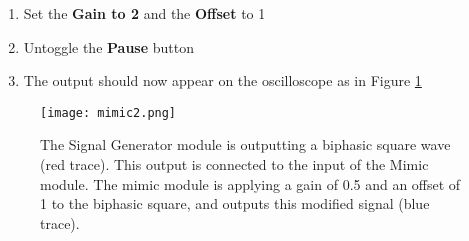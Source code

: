 \begin{enumerate}
\begin{itemize}
  \item Activate the channel by hitting the toggle button \textbf{Active}
  \item Change the scale to \textbf{1 V/div} in the Scale pulldown menu
  \item Change the color to \textbf{Blue}
  \item Click the \textbf{Apply} button to save the changes
  \end{itemize}
\item Set the \textbf{Gain to 2} and the \textbf{Offset} to 1
\item Untoggle the \textbf{Pause} button
\item The output should now appear on the oscilloscope as in Figure \ref{mimic2}
\end{enumerate}

\begin{figure}[h]
\begin{center}
\texttt{[image: mimic2.png]} 
\caption[Mimic]{The Signal Generator module is outputting a biphasic square wave (red trace). This output is connected to the input of the Mimic module. The mimic module is applying a gain of 0.5 and an offset of 1 to the biphasic square, and outputs this modified signal (blue trace).}
\end{center}
\label{mimic2}
\end{figure}
